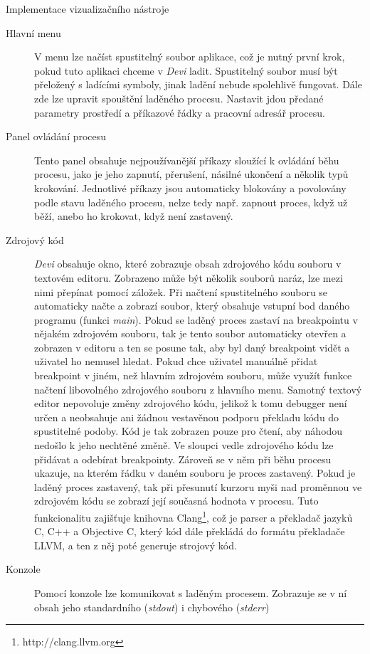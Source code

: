 \documentclass[bc,male,python,dept460]{diploma}						%
\begin{document}
\begin{section}{Implementace vizualizačního nástroje}
	\begin{description}
		\item[Hlavní menu] V menu lze načíst spustitelný soubor aplikace, což je nutný první krok, pokud tuto aplikaci chceme v \textit{Devi} ladit.
			Spustitelný soubor musí být přeložený s ladícími symboly, jinak ladění nebude spolehlivě fungovat. Dále zde lze upravit spouštění laděného procesu.
			Nastavit jdou předané parametry prostředí a příkazové řádky a pracovní adresář procesu.
		\item[Panel ovládání procesu] Tento panel obsahuje nejpoužívanější příkazy sloužící k ovládání běhu procesu, jako je jeho zapnutí, přerušení, násilné
			ukončení a několik typů krokování. Jednotlivé příkazy jsou automaticky blokovány a povolovány podle stavu laděného procesu, nelze tedy např. zapnout
			proces, když už běží, anebo ho krokovat, když není zastavený.
		\item[Zdrojový kód] \textit{Devi} obsahuje okno, které zobrazuje obsah zdrojového kódu souboru v textovém editoru. Zobrazeno může být několik souborů naráz,
			lze mezi nimi přepínat pomocí záložek. Při načtení spustitelného souboru se automaticky načte a zobrazí soubor, který obsahuje vstupní bod daného programu
			(funkci \textit{main}). Pokud se laděný proces zastaví na breakpointu v nějakém zdrojovém souboru, tak je tento soubor automaticky otevřen a zobrazen
			v editoru a ten se posune tak, aby byl daný breakpoint vidět a uživatel ho nemusel hledat. Pokud chce uživatel manuálně přidat breakpoint v jiném, než
			hlavním zdrojovém souboru, může využít funkce načtení libovolného zdrojového souboru z hlavního menu. Samotný textový editor nepovoluje změny zdrojového
			kódu, jelikož k tomu debugger není určen a neobsahuje ani žádnou vestavěnou podporu překladu kódu do spustitelné podoby. Kód je tak zobrazen pouze pro
			čtení, aby náhodou nedošlo k jeho nechtěné změně. Ve sloupci vedle zdrojového kódu lze přidávat a odebírat breakpointy. Zároveň se v něm při běhu procesu
			ukazuje, na kterém řádku v daném souboru je proces zastavený. Pokud je laděný proces zastavený, tak při přesunutí kurzoru myši nad proměnnou ve zdrojovém
			kódu se zobrazí její současná hodnota v procesu. Tuto funkcionalitu zajišťuje knihovna Clang\footnote{http://clang.llvm.org}, což je parser a překladač
			jazyků C, C++ a Objective C, který kód dále překládá do formátu překladače LLVM, a ten z něj poté generuje strojový kód.
		\item[Konzole] Pomocí konzole lze komunikovat s laděným procesem. Zobrazuje se v ní obsah jeho standardního (\textit{stdout}) i chybového (\textit{stderr})

\end{description}
\end{section}
\end{document}
